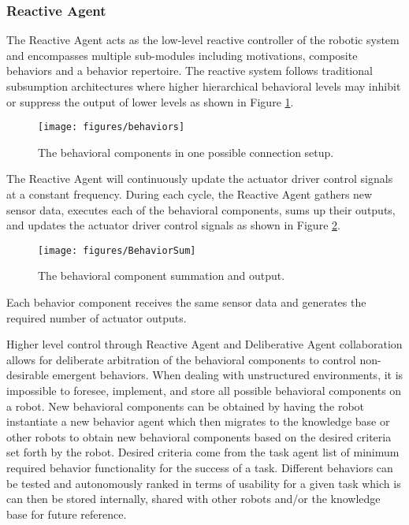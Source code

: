    \subsubsection{Reactive Agent}
     The Reactive Agent acts as the low-level reactive controller of the robotic 
       system and encompasses multiple sub-modules including motivations, 
       composite behaviors and a behavior repertoire.
     The reactive system follows traditional subsumption architectures where higher 
       hierarchical behavioral levels may inhibit or suppress the output of lower 
       levels as shown in Figure \ref{fig:behavioralcomponents}.
     \begin{figure}%
       \centerline{\texttt{[image: figures/behaviors]}}
       \caption{The behavioral components in one possible connection setup.}
       \label{fig:behavioralcomponents}
     \end{figure}
     The Reactive Agent will continuously update the actuator driver control 
       signals at a constant frequency.
     During each cycle, the Reactive Agent gathers new sensor data, executes 
       each of the behavioral components, sums up their outputs, and updates 
       the actuator driver control signals as shown in Figure 
       \ref{fig:behaviorsum}.
     \begin{figure}%
       \centerline{\texttt{[image: figures/BehaviorSum]}}
       \caption{The behavioral component summation and output.}
       \label{fig:behaviorsum}
     \end{figure}
     Each behavior component receives the same sensor data and generates the 
       required number of actuator outputs.

     Higher level control through Reactive Agent and Deliberative Agent 
       collaboration allows for deliberate arbitration of the behavioral 
       components to control non-desirable emergent behaviors.
     When dealing with unstructured environments, it is impossible to foresee, 
       implement, and store all possible behavioral components on a robot.
     New behavioral components can be obtained by having the robot instantiate a 
       new behavior agent which then migrates to the knowledge base or other 
       robots to obtain new behavioral components based on the desired criteria 
       set forth by the robot.
     Desired criteria come from the task agent list of minimum required behavior 
       functionality for the success of a task.
     Different behaviors can be tested and autonomously ranked in terms of 
       usability for a given task which is can then be stored internally, shared 
       with other robots and/or the knowledge base for future reference.

